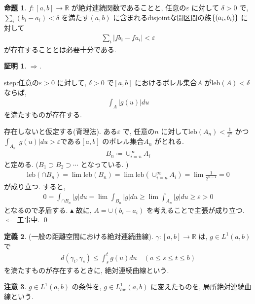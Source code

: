 \documentclass[10pt, fleqn, label-section=none]{bxjsarticle}
\theoremstyle{definition}
\newtheorem{dfn}{定義}[section]
\newtheorem{prop}[dfn]{命題}
\newtheorem*{pf*}{証明}
\newtheorem{remark}[dfn]{注意}
\newcommand{\veps}{\varepsilon}
\newcommand{\cbra}[1]{\mleft\{#1\mright\}}
\newcommand{\abs}[1]{\left|#1\right|}
\newcommand{\naraba}{\Rightarrow}
\newcommand{\gyaku}{\Leftarrow}
\renewcommand{\;}{\, ; \,}
\newenvironment{claim}[1]{\par\noindent\underline{step:}\space#1}{}
\newenvironment{claimproof}[1]{\par\noindent{($\because$)}\space#1}{\hfill $\blacktriangle $}
\begin{document}
\begin{prop}$f: [a,b] \rightarrow \mathbb R$ が絶対連続関数であることと, 
任意の$\veps$ に対して $\delta >0$ で, $\sum_i (b_i - a_i) < \delta$ を満たす$(a,b)$ に含まれるdisjointな開区間の族$\cbra{(a_i, b_i)}$ に対して
\begin{align*} \sum_i \abs{f b_i - f a_i} < \veps \end{align*}
が存在することとは必要十分である.
\end{prop}
\begin{pf*}
$\naraba.$ 
\begin{claim}
任意の$\veps >0$ に対して, $\delta > 0 $ で$[a, b]$ におけるボレル集合$A$ が$\textrm{leb}(A) < \delta$ ならば, 
\begin{align*} \int_A \abs{g(u)} du \end{align*}
を満たすものが存在する. 
\end{claim}
\begin{claimproof}
存在しないと仮定する(背理法). ある$\veps$ で, 任意の$n$ に対して$\textrm{leb}(A_n) < \frac{1}{2^n}$ かつ$\int_{A_n} \abs{g(u)} du > \veps$である$[a,b]$ のボレル集合$A_n$ がとれる. 
\begin{align*} B_n \coloneqq \cup_{i = n}^\infty A_i \end{align*}
と定める. ($B_1 \supset B_2 \supset \cdots $ となっている. )
\begin{align*}  \textrm{leb}(\cap B_n)   = \lim \textrm{leb}(B_n) = \lim  \textrm{leb}(\cup_{i = n}^\infty A_i) =  \lim \frac{1}{2^{n-1}} = 0 \end{align*}
が成り立つ. すると, 
\begin{align*} 0 = \int_{\cap B_n} \abs g du = \lim \int_{B_n} \abs g du \geq \lim \int_{A_n} \abs g du \geq \veps > 0\end{align*}
となるので矛盾する. 
\end{claimproof}
故に, $A = \cup (b_i - a_i)$ を考えることで主張が成り立つ. $\gyaku$ 工事中. 
\qed
\end{pf*}

\begin{dfn}(一般の距離空間における絶対連続曲線). $\gamma : [a, b] \rightarrow \mathbb R$ は, 
$g \in L^1(a,b)$ で
\begin{align*} d(\gamma_t, \gamma_s) \leq \int_s^t g(u) du \quad (a \leq s \leq t \leq b)\end{align*}
を満たすものが存在するときに, 絶対連続曲線という. 
\end{dfn}

\begin{remark}
$g \in L^1(a,b)$ の条件を, $g \in L^1_{loc} (a, b)$ に変えたものを, 局所絶対連続曲線という. 
\end{remark}
\end{document}
